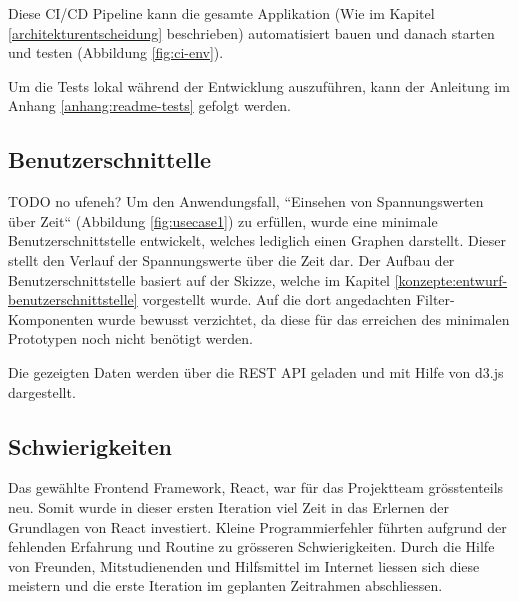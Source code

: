 Diese \ac{CI/CD} Pipeline kann die gesamte Applikation
(Wie im Kapitel \ref{architekturentscheidung} beschrieben) automatisiert bauen und
danach starten und testen (Abbildung \ref{fig:ci-env}).

Um die Tests lokal während der Entwicklung auszuführen, kann der Anleitung
im Anhang \ref{anhang:readme-tests} gefolgt werden.

\subsection{Benutzerschnittelle} TODO no ufeneh?
Um den Anwendungsfall, ``Einsehen von Spannungswerten über Zeit`` (Abbildung \ref{fig:usecase1}) zu erfüllen,
wurde eine minimale Benutzerschnittstelle entwickelt, welches lediglich einen Graphen darstellt.
Dieser stellt den Verlauf der Spannungswerte über die Zeit dar.
Der Aufbau der Benutzerschnittstelle basiert auf der Skizze,
welche im Kapitel \ref{konzepte:entwurf-benutzerschnittstelle} vorgestellt wurde.
Auf die dort angedachten Filter-Komponenten wurde bewusst verzichtet, da diese für das erreichen des
minimalen Prototypen noch nicht benötigt werden.

Die gezeigten Daten werden über die \ac{REST} \ac{API} geladen und mit Hilfe von d3.js dargestellt.


\subsection{Schwierigkeiten}
Das gewählte Frontend Framework, React, war für das Projektteam grösstenteils neu.
Somit wurde in dieser ersten Iteration viel Zeit in das Erlernen der Grundlagen von React investiert.
Kleine Programmierfehler führten aufgrund der fehlenden Erfahrung und Routine zu grösseren Schwierigkeiten.
Durch die Hilfe von Freunden, Mitstudienenden und Hilfsmittel im Internet liessen sich diese meistern
und die erste Iteration im geplanten Zeitrahmen abschliessen.
